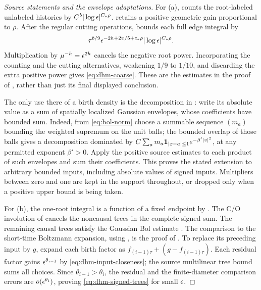 \begin{proof}[Source statements and the envelope adaptations]
For (a), \cite[Proposition 7.2]{DHM2025} counts the root-labeled
unlabeled histories by \(C^b|\log\epsilon|^{C_*\rho}\).
\cite[Proposition 9.7, Equation (9.51)]{DHM2025} retains a positive
geometric gain proportional to \(\rho\). After the regular cutting
operations, \cite[Equation (9.53)]{DHM2025} bounds each full edge
integral by
\[
 \tau^{b/9}\epsilon^{-2h+2\upsilon/5+c_*\rho}
       |\log\epsilon|^{C_*\rho}.
\]
Multiplication by \(\mu^{-h}=\epsilon^{2h}\) cancels the negative root
power. Incorporating the counting and the cutting alternatives,
weakening \(1/9\) to \(1/10\), and discarding the extra positive power
gives \eqref{eq:dhm-coarse}. These are the estimates in the proof of
\cite[Proposition 6.2, Section 9.2]{DHM2025}, rather than just its final
displayed conclusion.

The only use there of a birth density is the decomposition in
\cite[Equations (9.58)--(9.63)]{DHM2025}: write its absolute value as a
sum of spatially localized Gaussian envelopes, whose coefficients have
bounded sum. Indeed, from \eqref{eq:bol-norm} choose a summable sequence
\((m_a)\) bounding the weighted supremum on the unit balls; the bounded
overlap of those balls gives a decomposition dominated by
\(C\sum_a m_a\mathbf 1_{|x-a|\le1}e^{-\beta'|v|^2}\), at any permitted
exponent \(\beta'>0\). Apply the positive source estimates to each
product of such envelopes and sum their coefficients. This proves the
stated extension to arbitrary bounded inputs, including absolute values
of signed inputs. Multipliers between zero and one are kept in the
support throughout, or dropped only when a positive upper bound is
being taken.

For (b), the one-root integral is a function of a fixed endpoint by
\cite[Equation (14.2)]{DHM2025}. The C/O involution of
\cite[Proposition 14.2]{DHM2025} cancels the noncausal trees in the
complete signed sum. The remaining causal trees satisfy the Gaussian
Bol estimate \cite[Proposition 14.3, Equation (14.8)]{DHM2025}.
The comparison to the short-time Boltzmann expansion, using
, is the proof of
\cite[Proposition 6.1, Section 14]{DHM2025}. To replace its preceding
input by \(g\), expand each birth factor as
\(f_{(i-1)\tau}+(g-f_{(i-1)\tau})\). Each residual factor gains
\(\epsilon^{\theta_{i-1}}\) by \eqref{eq:dhm-input-closeness}; the source
multilinear tree bound sums all choices. Since
\(\theta_{i-1}>\theta_i\), the residual and the finite-diameter
comparison errors are \(o(\epsilon^{\theta_i})\), proving
\eqref{eq:dhm-signed-trees} for small \(\epsilon\).


\end{proof}

